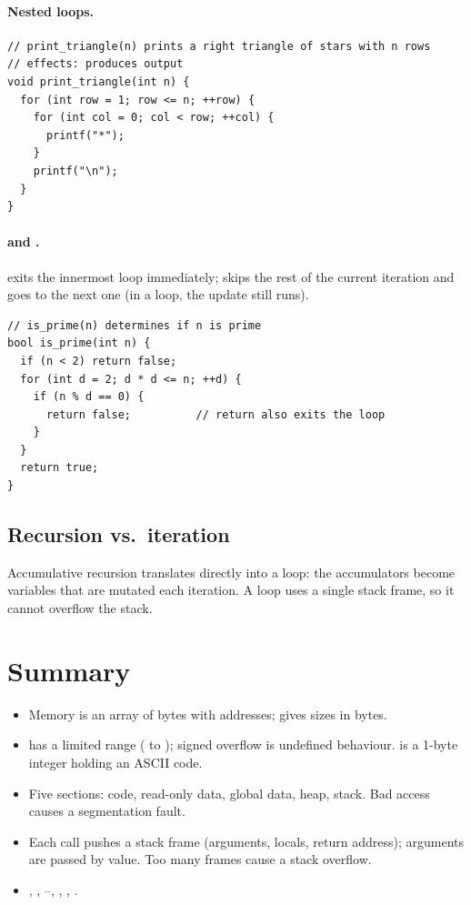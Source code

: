 \paragraph{Nested loops.}
\begin{lstlisting}[style=c]
// print_triangle(n) prints a right triangle of stars with n rows
// effects: produces output
void print_triangle(int n) {
  for (int row = 1; row <= n; ++row) {
    for (int col = 0; col < row; ++col) {
      printf("*");
    }
    printf("\n");
  }
}
\end{lstlisting}

\paragraph{ and .}  exits the innermost loop immediately;
 skips the rest of the current iteration and goes to the next one (in a
 loop, the update still runs).
\begin{lstlisting}[style=c]
// is_prime(n) determines if n is prime
bool is_prime(int n) {
  if (n < 2) return false;
  for (int d = 2; d * d <= n; ++d) {
    if (n % d == 0) {
      return false;          // return also exits the loop
    }
  }
  return true;
}
\end{lstlisting}

\subsection{Recursion vs.\ iteration}

Accumulative recursion translates directly into a loop: the accumulators become variables that
are mutated each iteration. A loop uses a single stack frame, so it cannot overflow the stack.

\section{Summary}
\begin{itemize}
  \item Memory is an array of bytes with addresses;  gives sizes in bytes.
  \item {} has a limited range ( to ); signed overflow is
    undefined behaviour.  is a 1-byte integer holding an ASCII code.
  \item Five sections: code, read-only data, global data, heap, stack. Bad access causes a
    segmentation fault.
  \item Each call pushes a stack frame (arguments, locals, return address); arguments are passed
    by value. Too many frames cause a stack overflow.
  \item {}, , --, , ,
    .
\end{itemize}
